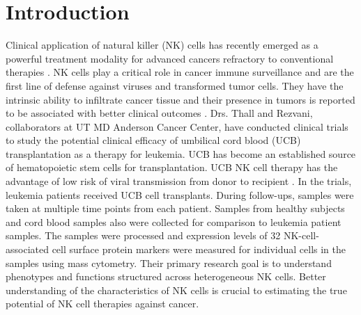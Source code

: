 \documentclass[12pt,]{article}
\begin{document}
\tableofcontents
\newpage

\section{Introduction}
Clinical application of natural killer (NK) cells
has recently emerged as a powerful treatment modality for advanced cancers
refractory to conventional therapies \citep{rezvani2015application}. 
NK cells play a critical role in cancer immune surveillance and are the first
line of defense against viruses and transformed tumor cells.  They have the
intrinsic ability to infiltrate cancer tissue and their presence in tumors is
reported to be associated with better clinical outcomes
\citep{suck2016natural}.  
Drs. Thall and Rezvani, collaborators at UT MD Anderson Cancer Center, have
conducted clinical trials to study the potential clinical efficacy of umbilical
cord blood (UCB) transplantation as a therapy for leukemia.  UCB has become an
established source of hematopoietic stem cells for transplantation. UCB NK cell
therapy has the advantage of low risk of viral transmission from donor to
recipient \citep{sarvaria2017umbilical}. In the trials, leukemia patients
received UCB cell transplants.
During follow-ups, samples were taken at multiple time points from each patient.
Samples from healthy subjects and cord blood samples also were collected for
comparison to leukemia patient samples.  The samples were processed and
expression levels of 32 NK-cell-associated cell surface protein markers were
measured for individual cells in the samples using mass cytometry.  Their
primary research goal is to understand phenotypes and functions structured
across heterogeneous NK cells.
Better understanding of the characteristics of NK cells is crucial to
estimating the true potential of NK cell therapies against cancer.
\end{document}
